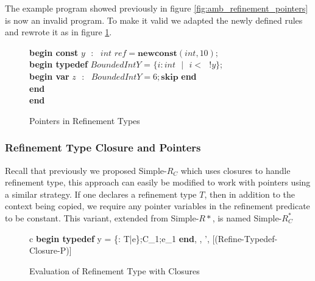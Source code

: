 \documentclass[a4paper,12pt]{report}
\newenvironment{tabs}[1]
 {\flushleft\TabPositions{#1}}
 {\endflushleft}
\begin{document}
\par
The example program showed previously in figure \ref{fig:amb_refinement_pointers} 
is now an invalid program. To make it valid we adapted the newly defined rules 
and rewrote it as in figure \ref{fig:valid_ptr_program}.

\begin{figure} [H]
  \begin{tabs}{1cm,2cm}
    \textbf{begin const }$y\text{ }:\text{ } int\textit{ ref} = \textbf{newconst}(int, 10);$\\
    \tab\textbf{begin typedef }$BoundedIntY$ = $\{i : int\text{ }|\text{ }i <\text{ }!y\}$; \\ 
    \tab\tab\textbf{begin var }$z\text{ }:\text{ }BoundedIntY = 6;\textbf{skip}$\textbf { end} \\
    \tab\textbf {end} \\
    \textbf{end}
  \end{tabs}  
  \caption{Pointers in Refinement Types}
  \label{fig:valid_ptr_program}
\end{figure}


\subsubsection{Refinement Type Closure and Pointers}
Recall that previously we proposed Simple-$R_{C}$ which uses closures to handle 
refinement type, this approach can easily be modified to work with pointers using a 
similar strategy. If one declares a refinement type $T$, then in addition to 
the context being copied, we require any pointer variables in the refinement 
predicate to be constant. This variant, extended from Simple-$R{*}$, is 
named Simple-$R^{*}_{C}$

\begin{figure}[H]
  \begin{center}
    \begin{tabular} {c}      
      {\langle\textbf{begin typedef } y = \{\upsilon : T\text{ }|\text{ }e\};C_1;e_1\textbf{ end}, 
      \sigma, \tau \rangle \longrightarrow \langle \sigma', \tau \rangle} [(Refine-Typedef-Closure-P)]
    \end{tabular}
  \end{center}
  \caption{Evaluation of Refinement Type with Closures}
\end{figure}
\end{document}
